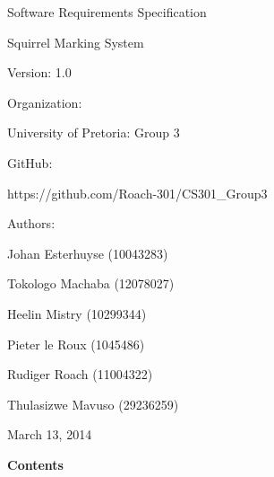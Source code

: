 \documentclass{article}
\begin{document}
\noindent 

\noindent 

\noindent 

\noindent 



 

\noindent 

\noindent  Software Requirements Specification

\noindent   Squirrel Marking System

\noindent   Version: 1.0

\noindent 

\noindent Organization:

\noindent University of Pretoria: Group 3

\noindent  GitHub:

\noindent  

  https://github.com/Roach-301/CS301\_Group3 

\noindent 

\noindent Authors:

\noindent Johan Esterhuyse (10043283)

\noindent Tokologo Machaba (12078027)

\noindent Heelin Mistry (10299344)

\noindent Pieter le Roux (1045486)

\noindent Rudiger Roach (11004322)

\noindent Thulasizwe Mavuso (29236259)

\noindent 

\noindent March 13, 2014 

  







































\textbf{Contents}
\end{document}
